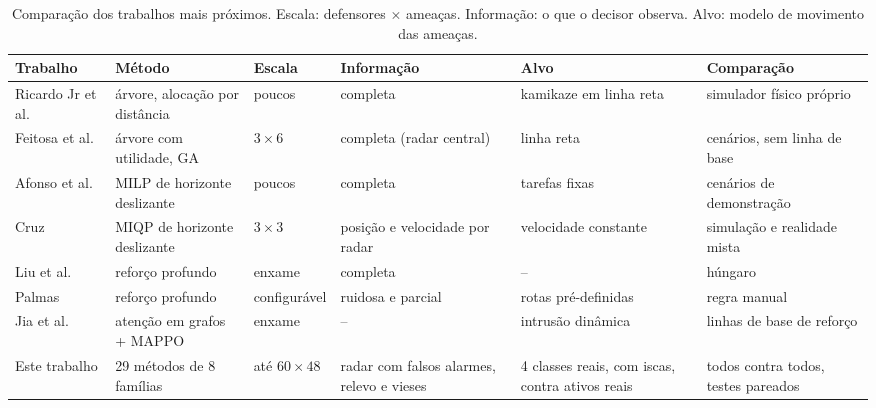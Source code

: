 \begin{table}[t]
\centering
\caption{Comparação dos trabalhos mais próximos. Escala: defensores $\times$ ameaças. Informação: o que o decisor
observa. Alvo: modelo de movimento das ameaças.}
\label{tab:relacionados}
\scriptsize
\renewcommand{\arraystretch}{1.25}
\begin{tabularx}{\textwidth}{@{}>{\raggedright}p{2.2cm}>{\raggedright}p{2.6cm}>{\raggedright}p{1.6cm}>{\raggedright}p{2.2cm}>{\raggedright}p{2.0cm}>{\raggedright\arraybackslash}X@{}}
\toprule
Trabalho & Método & Escala & Informação & Alvo & Comparação \\
\midrule
Ricardo Jr et al.~\cite{ricardo2023} & árvore, alocação por distância & poucos & completa & kamikaze em linha reta & simulador físico próprio \\
Feitosa et al.~\cite{feitosa2025} & árvore com utilidade, GA & $3\times6$ & completa (radar central) & linha reta & 9 cenários, sem linha de base \\
Afonso et al.~\cite{afonso2020} & MILP de horizonte deslizante & poucos & completa & tarefas fixas & cenários de demonstração \\
Cruz~\cite{cruz2025} & MIQP de horizonte deslizante & $3\times3$ & posição e velocidade por radar & velocidade constante & simulação e realidade mista \\
Liu et al.~\cite{liu2023drones} & reforço profundo & enxame & completa & -- & húngaro \\
Palmas~\cite{palmas2025} & reforço profundo & configurável & ruidosa e parcial & rotas pré-definidas & regra manual \\
Jia et al.~\cite{jia2026} & atenção em grafos + MAPPO & enxame & -- & intrusão dinâmica & linhas de base de reforço \\
\midrule
Este trabalho & 29 métodos de 8 famílias & até $60\times48$ & radar com falsos alarmes, relevo e vieses & 4 classes reais, com iscas, contra ativos reais & todos contra todos, testes pareados \\
\bottomrule
\end{tabularx}
\end{table}
